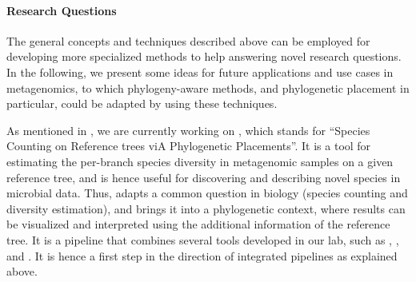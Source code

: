 \paragraph{Research Questions}
\label{ch:ConclusionOutlook:par:ResearchQuestions}


The general concepts and techniques described above %
can be employed for developing more specialized methods to help answering novel research questions.
In the following, we present some ideas for future applications and use cases in metagenomics,
to which phylogeny-aware methods, and phylogenetic placement in particular, could be adapted
by using these techniques.

As mentioned in , we are currently working on ,
which stands for ``Species Counting on Reference trees viA Phylogenetic Placements''.
It is a tool for estimating the per-branch species diversity in metagenomic samples on a given reference tree,
and is hence useful for discovering and describing novel species in microbial data.
Thus,  adapts a common question in biology (species counting and diversity estimation),
and brings it into a phylogenetic context,
where results can be visualized and interpreted using the additional information of the reference tree.
It is a pipeline that combines several tools developed in our lab, such as
 \cite{Barbera2018},  \cite{Morel2019}, and  \cite{Kapli2017}.
It is hence a first step in the direction of integrated pipelines as explained above.


